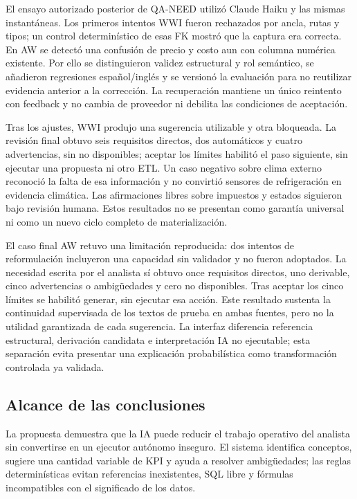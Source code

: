 \documentclass[11pt,letterpaper]{article}
\begin{document}
El ensayo autorizado posterior de QA-NEED utilizó Claude Haiku y las mismas
instantáneas. Los primeros intentos WWI fueron rechazados por ancla, rutas y tipos;
un control determinístico de esas FK mostró que la captura era correcta. En AW se
detectó una confusión de precio y costo aun con columna numérica existente. Por ello
se distinguieron validez estructural y rol semántico, se añadieron regresiones
español/inglés y se versionó la evaluación para no reutilizar evidencia anterior a
la corrección. La recuperación mantiene un único reintento con feedback y no cambia
de proveedor ni debilita las condiciones de aceptación.

Tras los ajustes, WWI produjo una sugerencia utilizable y otra bloqueada. La revisión
final obtuvo seis requisitos directos, dos automáticos y cuatro advertencias, sin
no disponibles; aceptar los límites habilitó el paso siguiente, sin ejecutar una
propuesta ni otro ETL. Un caso negativo sobre clima externo reconoció la falta de
esa información y no convirtió sensores de refrigeración en evidencia climática.
Las afirmaciones libres sobre impuestos y estados siguieron bajo revisión humana.
Estos resultados no se presentan como garantía universal ni como un nuevo ciclo
completo de materialización.

El caso final AW retuvo una limitación reproducida: dos intentos de reformulación
incluyeron una capacidad sin validador y no fueron adoptados. La necesidad escrita por
el analista sí obtuvo once requisitos directos, uno derivable, cinco advertencias o
ambigüedades y cero no disponibles. Tras aceptar los cinco límites se habilitó generar,
sin ejecutar esa acción. Este resultado sustenta la continuidad supervisada de los
textos de prueba en ambas fuentes, pero no la utilidad garantizada de cada sugerencia.
La interfaz diferencia referencia estructural, derivación candidata e interpretación
IA no ejecutable; esta separación evita presentar una explicación probabilística
como transformación controlada ya validada.

\subsection{Alcance de las conclusiones}

La propuesta demuestra que la IA puede reducir el trabajo operativo del analista sin convertirse en un ejecutor autónomo inseguro. El sistema identifica conceptos, sugiere una cantidad variable de KPI y ayuda a resolver ambigüedades; las reglas determinísticas evitan referencias inexistentes, SQL libre y fórmulas incompatibles con el significado de los datos.
\end{document}
